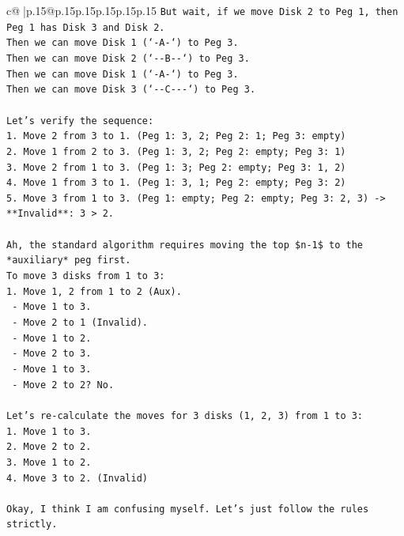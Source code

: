 \documentclass{article}
\begin{document}
{\begin{supertabular}{c@{$\;$}|p{.15\linewidth}@{}p{.15\linewidth}p{.15\linewidth}p{.15\linewidth}p{.15\linewidth}p{.15\linewidth}}
{{{\texttt{But wait, if we move Disk 2 to Peg 1, then Peg 1 has Disk 3 and Disk 2.} \\
\texttt{Then we can move Disk 1 (`{-}A{-}`) to Peg 3.} \\
\texttt{Then we can move Disk 2 (`{-}{-}B{-}{-}`) to Peg 3.} \\
\texttt{Then we can move Disk 1 (`{-}A{-}`) to Peg 3.} \\
\texttt{Then we can move Disk 3 (`{-}{-}C{-}{-}{-}`) to Peg 3.} \\
\\ 
\texttt{Let's verify the sequence:} \\
\texttt{1. Move 2 from 3 to 1. (Peg 1: 3, 2; Peg 2: 1; Peg 3: empty)} \\
\texttt{2. Move 1 from 2 to 3. (Peg 1: 3, 2; Peg 2: empty; Peg 3: 1)} \\
\texttt{3. Move 2 from 1 to 3. (Peg 1: 3; Peg 2: empty; Peg 3: 1, 2)} \\
\texttt{4. Move 1 from 3 to 1. (Peg 1: 3, 1; Peg 2: empty; Peg 3: 2)} \\
\texttt{5. Move 3 from 1 to 3. (Peg 1: empty; Peg 2: empty; Peg 3: 2, 3) {-}> **Invalid**: 3 > 2.} \\
\\ 
\texttt{Ah, the standard algorithm requires moving the top \$n{-}1\$ to the *auxiliary* peg first.} \\
\texttt{To move 3 disks from 1 to 3:} \\
\texttt{1. Move 1, 2 from 1 to 2 (Aux).} \\
\texttt{   {-} Move 1 to 3.} \\
\texttt{   {-} Move 2 to 1 (Invalid).} \\
\texttt{   {-} Move 1 to 2.} \\
\texttt{   {-} Move 2 to 3.} \\
\texttt{   {-} Move 1 to 3.} \\
\texttt{   {-} Move 2 to 2? No.} \\
\\ 
\texttt{Let's re{-}calculate the moves for 3 disks (1, 2, 3) from 1 to 3:} \\
\texttt{1. Move 1 to 3.} \\
\texttt{2. Move 2 to 2.} \\
\texttt{3. Move 1 to 2.} \\
\texttt{4. Move 3 to 2. (Invalid)} \\
\\ 
\texttt{Okay, I think I am confusing myself. Let's just follow the rules strictly.} \\
}}}
\end{supertabular}}
\end{document}
